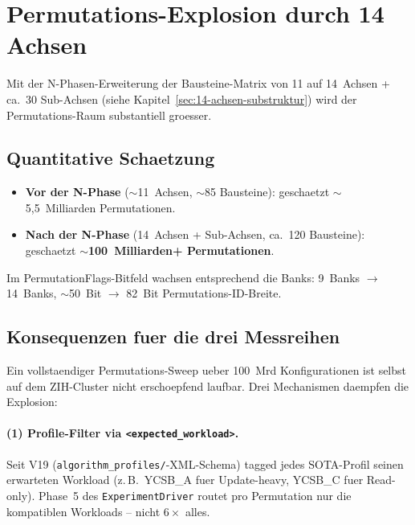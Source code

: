\section{Permutations-Explosion durch 14 Achsen}\label{sec:permexplosion}


Mit der N-Phasen-Erweiterung der Bausteine-Matrix von 11 auf
14~Achsen + ca.~30 Sub-Achsen (siehe Kapitel~\ref{sec:14-achsen-substruktur})
wird der Permutations-Raum substantiell groesser.

\subsection{Quantitative Schaetzung}

\begin{itemize}
    \item \textbf{Vor der N-Phase} ($\sim$11~Achsen, $\sim$85 Bausteine):
    geschaetzt $\sim$5,5~Milliarden Permutationen.
    \item \textbf{Nach der N-Phase} (14~Achsen + Sub-Achsen, ca.~120 Bausteine):
    geschaetzt \textbf{$\sim$100~Milliarden+ Permutationen}.
\end{itemize}

Im PermutationFlags-Bitfeld wachsen entsprechend die Banks:
9~Banks $\rightarrow$ 14~Banks, $\sim$50~Bit $\rightarrow$
82~Bit Permutations-ID-Breite.

\subsection{Konsequenzen fuer die drei Messreihen}

Ein vollstaendiger Permutations-Sweep ueber 100~Mrd Konfigurationen ist
selbst auf dem ZIH-Cluster nicht erschoepfend laufbar. Drei
Mechanismen daempfen die Explosion:

\paragraph{(1) Profile-Filter via \texttt{<expected\_workload>}.}
Seit V19 (\texttt{algorithm\_profiles/}-XML-Schema) tagged jedes
SOTA-Profil seinen erwarteten Workload (z.\,B.\ YCSB\_A fuer Update-heavy,
YCSB\_C fuer Read-only). Phase~5 des \texttt{ExperimentDriver} routet
pro Permutation nur die kompatiblen Workloads -- nicht $6\times$ alles.

